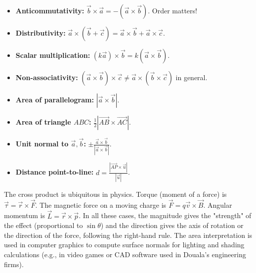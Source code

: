\documentclass[11pt]{article}
\begin{document}
\begin{aretenir}
\begin{itemize}
    \item \textbf{Anticommutativity:} $\vec{b} \times \vec{a} = -(\vec{a} \times \vec{b})$. Order matters!
    \item \textbf{Distributivity:} $\vec{a} \times (\vec{b}+\vec{c}) = \vec{a}\times\vec{b} + \vec{a}\times\vec{c}$.
    \item \textbf{Scalar multiplication:} $(k\vec{a})\times\vec{b} = k(\vec{a}\times\vec{b})$.
    \item \textbf{Non-associativity:} $(\vec{a}\times\vec{b})\times\vec{c} \neq \vec{a}\times(\vec{b}\times\vec{c})$ in general.
    \item \textbf{Area of parallelogram:} $|\vec{a} \times \vec{b}|$.
    \item \textbf{Area of triangle $ABC$:} $\frac{1}{2}|\vec{AB} \times \vec{AC}|$.
    \item \textbf{Unit normal to $\vec{a},\vec{b}$:} $\pm \frac{\vec{a}\times\vec{b}}{|\vec{a}\times\vec{b}|}$.
    \item \textbf{Distance point-to-line:} $d = \frac{|\vec{AP}\times\vec{u}|}{|\vec{u}|}$.
\end{itemize}
\end{aretenir}

\begin{savaistu}
The cross product is ubiquitous in physics. Torque (moment of a force) is $\vec{\tau} = \vec{r} \times \vec{F}$. The magnetic force on a moving charge is $\vec{F} = q\vec{v} \times \vec{B}$. Angular momentum is $\vec{L} = \vec{r} \times \vec{p}$. In all these cases, the magnitude gives the "strength" of the effect (proportional to $\sin\theta$) and the direction gives the axis of rotation or the direction of the force, following the right-hand rule. The area interpretation is used in computer graphics to compute surface normals for lighting and shading calculations (e.g., in video games or CAD software used in Douala's engineering firms).
\end{savaistu}
\end{document}
